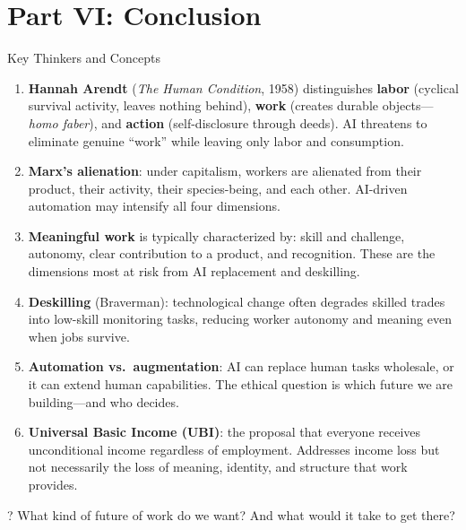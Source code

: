 ﻿\documentclass[aspectratio=169,11pt]{beamer}
\begin{document}
\section{Part VI: Conclusion}

\begin{frame}[allowframebreaks]{Key Thinkers and Concepts}
\footnotesize
\begin{enumerate}
    \item \textbf{Hannah Arendt} (\textit{The Human Condition}, 1958) distinguishes \textbf{labor} (cyclical survival activity, leaves nothing behind), \textbf{work} (creates durable objects---\textit{homo faber}), and \textbf{action} (self-disclosure through deeds). AI threatens to eliminate genuine ``work'' while leaving only labor and consumption.
    \item \textbf{Marx's alienation}: under capitalism, workers are alienated from their product, their activity, their species-being, and each other. AI-driven automation may intensify all four dimensions.
    \item \textbf{Meaningful work} is typically characterized by: skill and challenge, autonomy, clear contribution to a product, and recognition. These are the dimensions most at risk from AI replacement and deskilling.
    \item \textbf{Deskilling} (Braverman): technological change often degrades skilled trades into low-skill monitoring tasks, reducing worker autonomy and meaning even when jobs survive.
    \item \textbf{Automation vs.\ augmentation}: AI can replace human tasks wholesale, or it can extend human capabilities. The ethical question is which future we are building---and who decides.
    \item \textbf{Universal Basic Income (UBI)}: the proposal that everyone receives unconditional income regardless of employment. Addresses income loss but not necessarily the loss of meaning, identity, and structure that work provides.
\end{enumerate}

\begin{alertblock}{?}
What kind of future of work do we want? And what would it take to get there?
\end{alertblock}
\end{frame}
\end{document}

